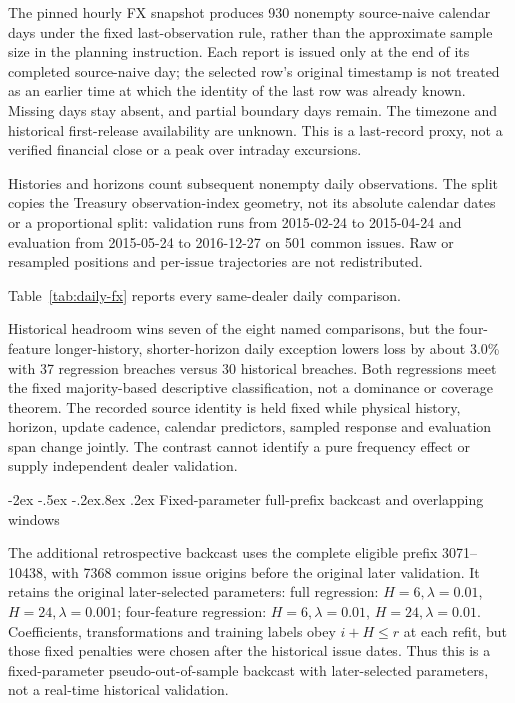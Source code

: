 \documentclass[10pt,a4paper]{article}
\makeatletter
\renewcommand\section{\@startsection{section}{1}{\z@}%
  {-2ex \@plus -.5ex \@minus -.2ex}{.8ex \@plus .2ex}%
  {\normalfont\large\bfseries}}
\makeatother
\begin{document}
The pinned hourly FX snapshot produces 930 nonempty source-naive calendar
days under the fixed last-observation rule, rather than the approximate sample
size in the planning instruction. Each report is issued only at the end of its
completed source-naive day; the selected row's original timestamp is not treated
as an earlier time at which the identity of the last row was already known.
Missing days stay absent, and partial boundary days remain. The timezone and
historical first-release availability are unknown. This is a last-record proxy,
not a verified financial close or a peak over intraday excursions.

Histories and horizons count subsequent nonempty daily observations. The split
copies the Treasury observation-index geometry, not its absolute calendar dates
or a proportional split: validation runs from 2015-02-24 to 2015-04-24 and evaluation from
2015-05-24 to 2016-12-27 on 501 common issues. Raw or resampled positions
and per-issue trajectories are not redistributed.

Table~\ref{tab:daily-fx} reports every same-dealer daily comparison.


Historical headroom wins seven of the eight named comparisons, but the
four-feature longer-history, shorter-horizon daily exception lowers loss by
about 3.0\% with 37 regression breaches versus 30 historical breaches.
Both regressions meet the fixed majority-based descriptive classification,
not a dominance or coverage theorem. The recorded source identity is held fixed while physical history, horizon, update cadence, calendar predictors, sampled response and evaluation span change jointly. The contrast cannot
identify a pure frequency effect or supply independent dealer validation.


\section{Fixed-parameter full-prefix backcast and overlapping windows}\label{sup:v8-backcast}

The additional retrospective backcast uses the complete eligible prefix
3071--10438, with 7368 common issue origins before the original later
validation. It retains the original later-selected parameters: full regression: \(H=6,\lambda=0.01\), \(H=24,\lambda=0.001\); four-feature regression: \(H=6,\lambda=0.01\), \(H=24,\lambda=0.01\).
Coefficients, transformations and training labels obey \(i+H\le r\) at each
refit, but those fixed penalties were chosen after the historical issue dates.
Thus this is a fixed-parameter pseudo-out-of-sample backcast with later-selected
parameters, not a real-time historical validation.
\end{document}
